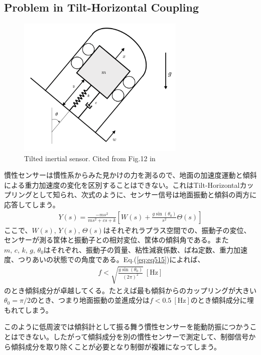 \subsection{Problem in Tilt-Horizontal Coupling}
\begin{figure}[h]
  \begin{center}   
    \includegraphics[width=8cm]{./img_chap5/img509.png}
    \caption{Tilted inertial sensor. Cited from Fig.12 in \cite{collette2012inertial}} \label{img:img509}
  \end{center}
\end{figure}

慣性センサーは慣性系からみた見かけの力を測るので、地面の加速度運動と傾斜による重力加速度の変化を区別することはできない。これはTilt-Horizontalカップリングとして知られ、次式のように、センサー信号は地面振動と傾斜の両方に応答してしまう\cite{collette2012inertial}。
\begin{eqnarray}
  Y(s)=\frac{-m s^{2}}{m s^{2}+c s+k} \left[ W(s) + \frac{g \sin \left(\theta_{0}\right)}{s^2} \Theta(s) \right] \label{eq:eq515}
\end{eqnarray}
ここで、$W(s),\,Y(s),\,\Theta(s)$はそれぞれラプラス空間での、振動子の変位、センサーが測る筐体と振動子との相対変位、筐体の傾斜角である。また$m,\,c,\,k,\,g,\,\theta_0$はそれぞれ、振動子の質量、粘性減衰係数、ばね定数、重力加速度、つりあいの状態での角度である。Eq.(\ref{eq:eq515})によれば、
\begin{eqnarray}
  f < \sqrt{\frac{g\sin(\theta_0)}{(2\pi)^2}}\ [\mathrm{Hz}]
  \label{eq:eq515}
\end{eqnarray}
のとき傾斜成分が卓越してくる。たとえば最も傾斜からのカップリングが大きい$\theta_0=\pi/2$のとき、つまり地面振動の並進成分は$f<0.5\ [\mathrm{Hz}]$のとき傾斜成分に埋もれてしまう。

このように低周波では傾斜計として振る舞う慣性センサーを能動防振につかうことはできない。したがって傾斜成分を別の慣性センサーで測定して、制御信号から傾斜成分を取り除くことが必要となり制御が複雑になってしまう\cite{biscans2018optimization}。



